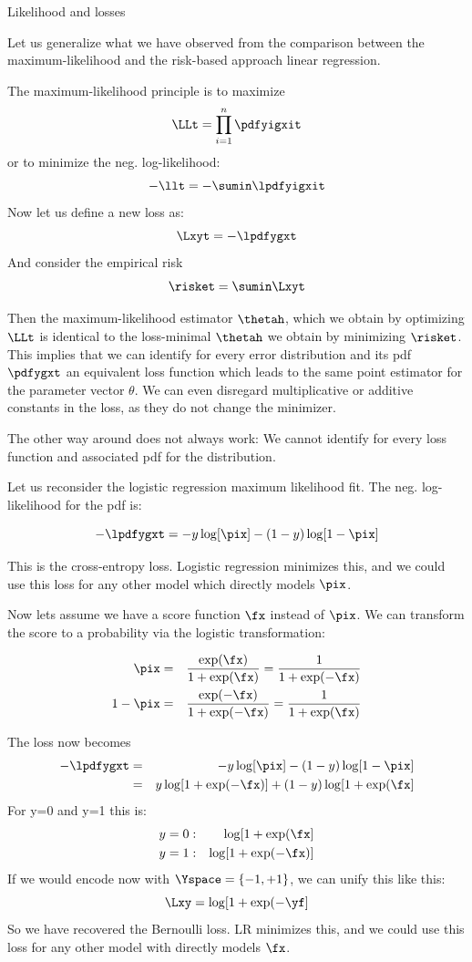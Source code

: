 \begin{vbframe}{Likelihood and losses}

Let us generalize what we have observed from the comparison between the maximum-likelihood and the risk-based approach linear regression.

The maximum-likelihood principle is to maximize
$$ \LLt = \prod_{i=1}^n \pdfyigxit $$
or to minimize the neg. log-likelihood:
$$ -\llt = -\sumin \lpdfyigxit $$
Now let us define a new loss as:
$$ \Lxyt = - \lpdfygxt $$
And consider the empirical risk
$$\risket = \sumin \Lxyt$$

Then the maximum-likelihood estimator $\thetah$, which we obtain by optimizing $\LLt$ is identical
to the loss-minimal $\thetah$ we obtain by minimizing $\risket$.
This implies that we can identify for every error distribution and its pdf $\pdfygxt$ an
equivalent loss function which leads to the same point estimator for the parameter vector $\theta$.
We can even disregard multiplicative or additive constants in the loss,
as they do not change the minimizer.

The other way around does not always work: We cannot identify for every loss function and associated pdf for the distribution. 

\framebreak

Let us reconsider the logistic regression maximum likelihood fit. The neg. log-likelihood for the pdf is:

$$
-\lpdfygxt = - y \log[\pix] - (1-y) \log [1 - \pix]
$$

This is the cross-entropy loss. Logistic regression minimizes this, and we could use this loss for any other model which directly models $\pix$.

\lz

Now lets assume we have a score function $\fx$ instead of $\pix$. We can transform the score to a probability via the logistic transformation:

\begin{eqnarray*}
\pix     &=& \frac{\exp(\fx)}{1 + \exp(\fx)}   =  \frac{1}{1 + \exp(-\fx)}\\
1- \pix  &=& \frac{\exp(-\fx)}{1 + \exp(-\fx)} =  \frac{1}{1 + \exp(\fx)}\\
\end{eqnarray*}

\framebreak

The loss now becomes
\begin{eqnarray*}
-\lpdfygxt &=& -y \log[\pix] - (1-y) \log [1 - \pix] \\
           &=& y \log[1 + \exp(-\fx)] + (1-y) \log[1 + \exp(\fx] \\
\end{eqnarray*}
For y=0 and y=1 this is:
\begin{eqnarray*}
y=0 &:& \log[1 + \exp(\fx] \\
y=1 &:& \log[1 + \exp(-\fx)]
\end{eqnarray*}
If we would encode now with $\Yspace = \{-1,+1\}$, we can unify this like this:
$$\Lxy = \log[1 + \exp(-\yf] $$
So we have recovered the Bernoulli loss. LR minimizes this, and we could use this loss for any other model with directly models $\fx$.


\end{vbframe}

